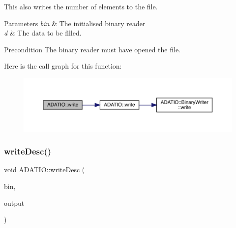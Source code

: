 This also writes the number of elements to the file. 
\begin{DoxyParams}{Parameters}
{\em bin} & The initialised binary reader \\
\hline
{\em d} & The data to be filled.\\
\hline
\end{DoxyParams}
\begin{DoxyPrecond}{Precondition}
The binary reader must have opened the file. 
\end{DoxyPrecond}
Here is the call graph for this function\+:
\nopagebreak
\begin{figure}[H]
\begin{center}
\leavevmode
\includegraphics[width=350pt]{d0/dba/namespaceADATIO_a29572ec079e7257de618b505e0baee59_cgraph}
\end{center}
\end{figure}
\mbox{\label{namespaceADATIO_a0faeed900aacb29febaa709323135c50}} 
\subsubsection{\texorpdfstring{writeDesc()}{writeDesc()}}
{\footnotesize\ttfamily void A\+D\+A\+T\+I\+O\+::write\+Desc (\begin{DoxyParamCaption}\item[{\mbox{\hyperlink{classADATIO_1_1BinaryWriter}{Binary\+Writer}} \&}]{bin,  }\item[{const std\+::string \&}]{output }\end{DoxyParamCaption})}

